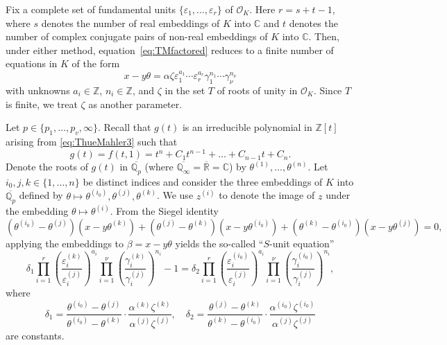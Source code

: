 \documentclass[11pt]{report}
\theoremstyle{definition}
\newcommand{\eps}{\varepsilon}
\begin{document}
Fix a complete set of fundamental units $\{\eps_1, \dots, \eps_r\}$ of $\mathcal{O}_K$. Here $r = s + t -1$, where $s$ denotes the number of real embeddings of $K$ into $\mathbb{C}$ and $t$ denotes the number of complex conjugate pairs of non-real embeddings of $K$ into $\mathbb{C}$. Then, under either method, equation~\eqref{eq:TMfactored} reduces to a finite number of equations in $K$ of the form
\begin{equation} \label{eq:TMinK}
x-y\theta = \alpha \zeta \varepsilon_1^{a_1} \cdots \varepsilon_r^{a_r}\gamma_1^{n_1}\cdots \gamma_{\nu}^{n_{\nu}}
\end{equation}
with unknowns $a_i \in \mathbb{Z}$, $n_i \in \mathbb{Z}$, and $\zeta$ in the set $T$ of roots of unity in $\mathcal{O}_K$. Since $T$ is finite, we treat $\zeta$ as another parameter.

Let $p \in \{p_1, \dots, p_v, \infty\}$. Recall that $g(t)$ is an irreducible polynomial in $\mathbb{Z}[t]$ arising from \eqref{eq:ThueMahler3} such that
\[g(t) = f(t,1) = t^n + C_1 t^{n-1} + \dots + C_{n-1}t + C_n.\]
Denote the roots of $g(t)$ in $\overline{\mathbb{Q}_p}$ (where $\overline{\mathbb{Q}_{\infty}} = \overline{\mathbb{R}} = \mathbb{C}$) by $\theta^{(1)}, \dots, \theta^{(n)}$. Let $i_0, j, k \in \{1,\dots, n\}$ be distinct indices and consider the three embeddings of $K$ into $\overline{\mathbb{Q}_p}$ defined by $\theta \mapsto \theta^{(i_0)}, \theta^{(j)}, \theta^{(k)}$. We use $z^{(i)}$ to denote the image of $z$ under the embedding $\theta \mapsto \theta^{(i)}$. From the Siegel identity
\[(\theta^{(i_0)} - \theta^{(j)})(x-y\theta^{(k)}) + (\theta^{(j)} - \theta^{(k)})(x-y\theta^{(i_0)}) + (\theta^{(k)} - \theta^{(i_0)})(x-y\theta^{(j)}) = 0,\]
applying the embeddings to $\beta = x-y\theta$ yields the so-called ``$S$-unit equation''
\begin{equation} \label{eq:Sunit}
\delta_1 \prod_{i = 1}^r\left( \frac{\varepsilon_i^{(k)}}{\varepsilon_i^{(j)}}\right)^{a_i}\prod_{i = 1}^{\nu} \left( \frac{\gamma_i^{(k)}}{\gamma_i^{(j)}}\right)^{n_i} - 1 = \delta_2 \prod_{i = 1}^{r}\left( \frac{\varepsilon_i^{(i_0)}}{\varepsilon_i^{(j)}}\right)^{a_i} \prod_{i = 1}^{\nu} \left( \frac{\gamma_i^{(i_0)}}{\gamma_i^{(j)}}\right)^{n_i},
\end{equation}
where
\[\delta_1 = \frac{\theta^{(i_0)} - \theta^{(j)}}{\theta^{(i_0)} - \theta^{(k)}}\cdot\frac{\alpha^{(k)}\zeta^{(k)}}{\alpha^{(j)}\zeta^{(j)}}, \quad \delta_2 = \frac{\theta^{(j)} - \theta^{(k)}}{\theta^{(k)} - \theta^{(i_0)}}\cdot \frac{\alpha^{(i_0)}\zeta^{(i_0)}}{\alpha^{(j)}\zeta^{(j)}}\]
are constants.
\end{document}
